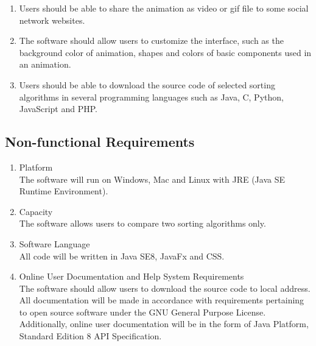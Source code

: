\documentclass[paper=a4, fontsize=11pt,twoside]{scrartcl}		%
\begin{document}

\begin{enumerate}
\item Users should be able to share the animation as video or gif file to some social network websites.

\item The software should allow users to customize the interface, such as the background color of animation, shapes and colors of basic components used in an animation.

\item Users should be able to download the source code of selected sorting algorithms in several programming languages such as Java, C, Python, JavaScript and PHP.

\end{enumerate}


\subsection{Non-functional Requirements}
\begin{enumerate}
\item Platform\\ The software will run on Windows, Mac and Linux with JRE (Java SE Runtime Environment).

\item Capacity\\The software allows users to compare two sorting algorithms only.

\item Software Language\\ All code will be written in Java SE8, JavaFx and CSS.  

\item Online User Documentation and Help System Requirements\\The software should allow users to download the source code to local address. All documentation will be made in accordance with requirements pertaining to open source software under the GNU General Purpose License. Additionally, online user documentation will be in the form of Java Platform, Standard Edition 8 API Specification.

\end{enumerate}


\end{document}
